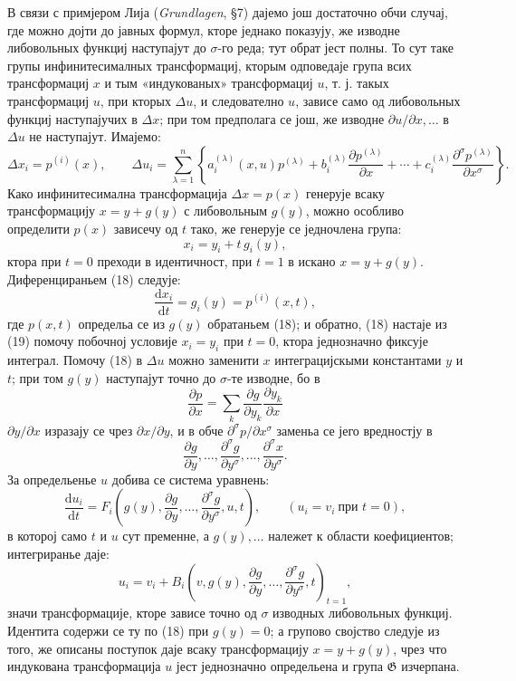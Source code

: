 ﻿\documentclass[11pt]{article}
\providecommand{\G}{\mathfrak G}
\providecommand{\D}{\Delta}
\providecommand{\p}{\partial}
\providecommand{\dd}{\mathrm d}
\begin{document}
В связи с примјером Лија (\emph{Grundlagen}, \S{}7) дајемо још достаточно обчи случај, где можно дојти до јавных формул, кторе једнако показују, же изводне либовольных функциј наступајут до \(\sigma\)-го реда; тут обрат јест полны. То сут таке групы инфинитесималных трансформациј, кторым одповедаје група всих трансформациј \(x\) и тым «индукованых» трансформациј \(u\), т. ј. такых трансформациј \(u\), при кторых \(\D u\), и следователно \(u\), зависе само од либовольных функциј наступајучих в \(\D x\); при том предполага се још, же изводне \(\p u/\p x,\ldots\) в \(\D u\) не наступајут. Имајемо:
\[
\D x_i=p^{(i)}(x),\qquad
\D u_i=
\sum_{\lambda=1}^{n}\left\{
a_i^{(\lambda)}(x,u)p^{(\lambda)}
+b_i^{(\lambda)}\frac{\p p^{(\lambda)}}{\p x}
+\cdots+
c_i^{(\lambda)}\frac{\p^\sigma p^{(\lambda)}}{\p x^\sigma}
\right\}.
\]
Како инфинитесимална трансформација \(\D x=p(x)\) генерује всаку трансформацију \(x=y+g(y)\) с либовольным \(g(y)\), можно особливо определити \(p(x)\) зависечу од \(t\) тако, же генерује се једночлена група:
\begin{equation}
x_i=y_i+t\,g_i(y),
\tag{18}
\end{equation}
ктора при \(t=0\) преходи в идентичност, при \(t=1\) в искано \(x=y+g(y)\). Диференцираньем (18) следује:
\begin{equation}
\frac{\dd x_i}{\dd t}=g_i(y)=p^{(i)}(x,t),
\tag{19}
\end{equation}
где \(p(x,t)\) определьа се из \(g(y)\) обратаньем (18); и обратно, (18) настаје из (19) помочу побочној условије \(x_i=y_i\) при \(t=0\), ктора једнозначно фиксује интеграл. Помочу (18) в \(\D u\) можно заменити \(x\) интеграцијскыми константами \(y\) и \(t\); при том \(g(y)\) наступајут точно до \(\sigma\)-те изводне, бо в
\[
\frac{\p p}{\p x}=\sum_k\frac{\p g}{\p y_k}\frac{\p y_k}{\p x}
\]
\(\p y/\p x\) изразају се чрез \(\p x/\p y\), и в обче \(\p^\sigma p/\p x^\sigma\) заменьа се јего вредностју в
\[
\frac{\p g}{\p y},\ldots,\frac{\p^\sigma g}{\p y^\sigma},\ldots,\frac{\p^\sigma x}{\p y^\sigma}.
\]
За определьенье \(u\) добива се система уравнень:
\[
\frac{\dd u_i}{\dd t}
=
F_i\!\left(g(y),\frac{\p g}{\p y},\ldots,\frac{\p^\sigma g}{\p y^\sigma},u,t\right),
\qquad (u_i=v_i\ \text{при }t=0),
\]
в которој само \(t\) и \(u\) сут пременне, а \(g(y),\ldots\) належет к области коефициентов; интегриранье даје:
\[
u_i=v_i+
B_i\!\left(v,g(y),\frac{\p g}{\p y},\ldots,\frac{\p^\sigma g}{\p y^\sigma},t\right)_{t=1},
\]
значи трансформације, кторе зависе точно од \(\sigma\) изводных либовольных функциј. Идентита содержи се ту по (18) при \(g(y)=0\); а групово својство следује из того, же описаны поступок даје всаку трансформацију \(x=y+g(y)\), чрез что индукована трансформација \(u\) јест једнозначно определьена и група \(\G\) изчерпана.
\end{document}
